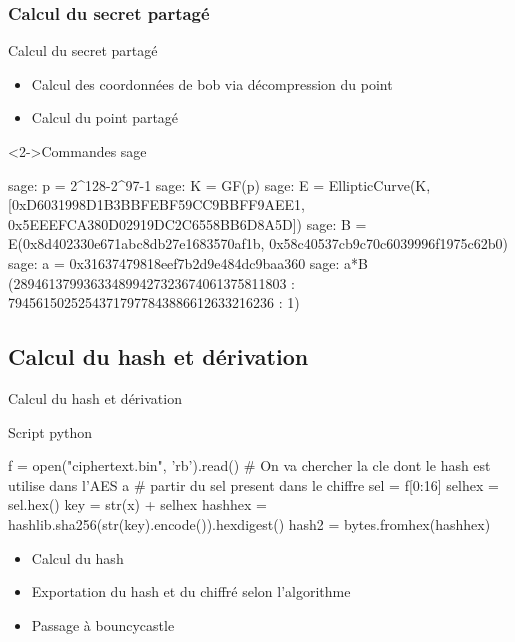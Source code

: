 \documentclass[10pt,sans,usenames,dvipsnames,french,compress]{beamer}
\begin{document}
\subsubsection{Calcul du secret partagé}
\begin{frame}[fragile]{Calcul du secret partagé}
  \begin{itemize}{}
    \item Calcul des coordonnées de bob via décompression du point
    \item <2->Calcul du point partagé
  \end{itemize}
  \begin{block}<2->{Commandes sage}
    \begin{python}
  sage: p = 2^128-2^97-1
  sage: K = GF(p)
  sage: E = EllipticCurve(K,
  [0xD6031998D1B3BBFEBF59CC9BBFF9AEE1,
  0x5EEEFCA380D02919DC2C6558BB6D8A5D])
  sage: B = E(0x8d402330e671abc8db27e1683570af1b,
  0x58c40537cb9c70c6039996f1975c62b0)
  sage: a = 0x31637479818eef7b2d9e484dc9baa360
  sage: a*B
  (289461379936334899427323674061375811803 :
   79456150252543717977843886612633216236 : 1)
    \end{python}
    \vspace{-2mm}
  \end{block}
\end{frame}

\subsection{Calcul du hash et dérivation}
\begin{frame}[fragile]{Calcul du hash et dérivation}
  \begin{block}{Script python}
    \begin{python}
  f = open("ciphertext.bin", 'rb').read()
  # On va chercher la cle dont le hash est utilise dans l'AES a
  # partir du sel present dans le chiffre
  sel = f[0:16]
  selhex = sel.hex()
  key = str(x) + selhex
  hashhex = hashlib.sha256(str(key).encode()).hexdigest()
  hash2 = bytes.fromhex(hashhex)
    \end{python}
    \vspace{-2mm}
  \end{block}
  \begin{block}{}
    \begin{itemize}
      \item Calcul du hash
      \item <2-> Exportation du hash et du chiffré selon l'algorithme
      \item <3-> Passage à bouncycastle
    \end{itemize}

  \end{block}

\end{frame}
\end{document}
